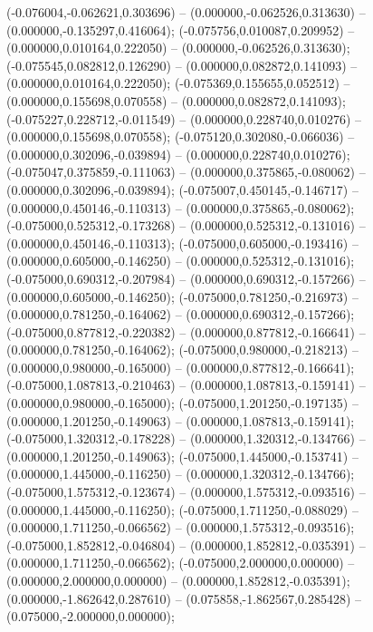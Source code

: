  (-0.076004,-0.062621,0.303696) -- (0.000000,-0.062526,0.313630) -- (0.000000,-0.135297,0.416064);
 (-0.075756,0.010087,0.209952) -- (0.000000,0.010164,0.222050) -- (0.000000,-0.062526,0.313630);
 (-0.075545,0.082812,0.126290) -- (0.000000,0.082872,0.141093) -- (0.000000,0.010164,0.222050);
 (-0.075369,0.155655,0.052512) -- (0.000000,0.155698,0.070558) -- (0.000000,0.082872,0.141093);
 (-0.075227,0.228712,-0.011549) -- (0.000000,0.228740,0.010276) -- (0.000000,0.155698,0.070558);
 (-0.075120,0.302080,-0.066036) -- (0.000000,0.302096,-0.039894) -- (0.000000,0.228740,0.010276);
 (-0.075047,0.375859,-0.111063) -- (0.000000,0.375865,-0.080062) -- (0.000000,0.302096,-0.039894);
 (-0.075007,0.450145,-0.146717) -- (0.000000,0.450146,-0.110313) -- (0.000000,0.375865,-0.080062);
 (-0.075000,0.525312,-0.173268) -- (0.000000,0.525312,-0.131016) -- (0.000000,0.450146,-0.110313);
 (-0.075000,0.605000,-0.193416) -- (0.000000,0.605000,-0.146250) -- (0.000000,0.525312,-0.131016);
 (-0.075000,0.690312,-0.207984) -- (0.000000,0.690312,-0.157266) -- (0.000000,0.605000,-0.146250);
 (-0.075000,0.781250,-0.216973) -- (0.000000,0.781250,-0.164062) -- (0.000000,0.690312,-0.157266);
 (-0.075000,0.877812,-0.220382) -- (0.000000,0.877812,-0.166641) -- (0.000000,0.781250,-0.164062);
 (-0.075000,0.980000,-0.218213) -- (0.000000,0.980000,-0.165000) -- (0.000000,0.877812,-0.166641);
 (-0.075000,1.087813,-0.210463) -- (0.000000,1.087813,-0.159141) -- (0.000000,0.980000,-0.165000);
 (-0.075000,1.201250,-0.197135) -- (0.000000,1.201250,-0.149063) -- (0.000000,1.087813,-0.159141);
 (-0.075000,1.320312,-0.178228) -- (0.000000,1.320312,-0.134766) -- (0.000000,1.201250,-0.149063);
 (-0.075000,1.445000,-0.153741) -- (0.000000,1.445000,-0.116250) -- (0.000000,1.320312,-0.134766);
 (-0.075000,1.575312,-0.123674) -- (0.000000,1.575312,-0.093516) -- (0.000000,1.445000,-0.116250);
 (-0.075000,1.711250,-0.088029) -- (0.000000,1.711250,-0.066562) -- (0.000000,1.575312,-0.093516);
 (-0.075000,1.852812,-0.046804) -- (0.000000,1.852812,-0.035391) -- (0.000000,1.711250,-0.066562);
 (-0.075000,2.000000,0.000000) -- (0.000000,2.000000,0.000000) -- (0.000000,1.852812,-0.035391);
 (0.000000,-1.862642,0.287610) -- (0.075858,-1.862567,0.285428) -- (0.075000,-2.000000,0.000000);
